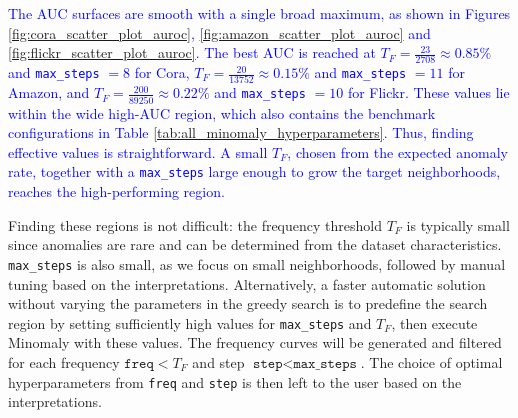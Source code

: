 \documentclass[preprint,12pt]{elsarticle}
\newcommand{\new}[1]{\textcolor{blue}{#1}}
\theoremstyle{plain}
\theoremstyle{definition}
\theoremstyle{remark}
\begin{document}
\new{The AUC surfaces are smooth with a single broad maximum, as shown in Figures \ref{fig:cora_scatter_plot_auroc}, \ref{fig:amazon_scatter_plot_auroc} and \ref{fig:flickr_scatter_plot_auroc}. The best AUC is reached at $T_F = \frac{23}{2708} \approx 0.85\%$ and \texttt{max\_steps} $= 8$ for Cora, $T_F = \frac{20}{13752} \approx 0.15\%$ and \texttt{max\_steps} $= 11$ for Amazon, and $T_F = \frac{200}{89250} \approx 0.22\%$ and \texttt{max\_steps} $= 10$ for Flickr. These values lie within the wide high-AUC region, which also contains the benchmark configurations in Table \ref{tab:all_minomaly_hyperparameters}. Thus, finding effective values is straightforward. A small $T_F$, chosen from the expected anomaly rate, together with a \texttt{max\_steps} large enough to grow the target neighborhoods, reaches the high-performing region.}

Finding these regions is not difficult: the frequency threshold \( T_F \) is typically small since anomalies are rare and can be determined from the dataset characteristics. \texttt{max\_steps} is also small, as we focus on small neighborhoods, followed by manual tuning based on the interpretations. Alternatively, a faster automatic solution without varying the parameters in the greedy search is to predefine the search region by setting sufficiently high values for \texttt{max\_steps} and \( T_F \), then execute Minomaly with these values. The frequency curves will be generated and filtered for each frequency \(\texttt{freq} < T_F\) and step \(\texttt{step} < \texttt{max\_steps}\). The choice of optimal hyperparameters from \texttt{freq} and \texttt{step} is then left to the user based on the interpretations.
\end{document}
